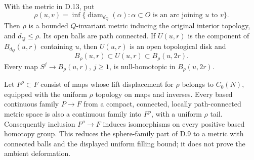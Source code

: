With the metric in D.13, put
\[
 \rho(u,v)=\inf\{\operatorname{diam}_{d_Q}(\alpha):
   \alpha\subset O\text{ is an arc joining }u\text{ to }v\}.
\]
Then $\rho$ is a bounded $Q$-invariant metric inducing the original
interior topology, and $d_Q\leq\rho$.  Its open balls are path
connected.  If $U(u,r)$ is the component of $B_{d_Q}(u,r)$
containing $u$, then $U(u,r)$ is an open topological disk and
\[
 B_\rho(u,r)\subset U(u,r)\subset B_\rho(u,2r).
\]
Every map $S^j\to B_\rho(u,r)$, $j\geq1$, is
null-homotopic in $B_\rho(u,2r)$.

Let $F^\rho\subset F$ consist of maps whose lift displacement for
$\rho$ belongs to $C_0(N)$, equipped with the uniform $\rho$ topology
on maps and inverses.  Every based continuous family $P\to F$ from
a compact, connected, locally path-connected metric space is also
a continuous family into $F^\rho$, with a uniform $\rho$ tail.
Consequently inclusion $F^\rho\to F$ induces isomorphisms on every
positive based homotopy group.  This reduces the sphere-family
part of D.9 to a metric with connected balls and the displayed
uniform filling bound; it does not prove the ambient deformation.
